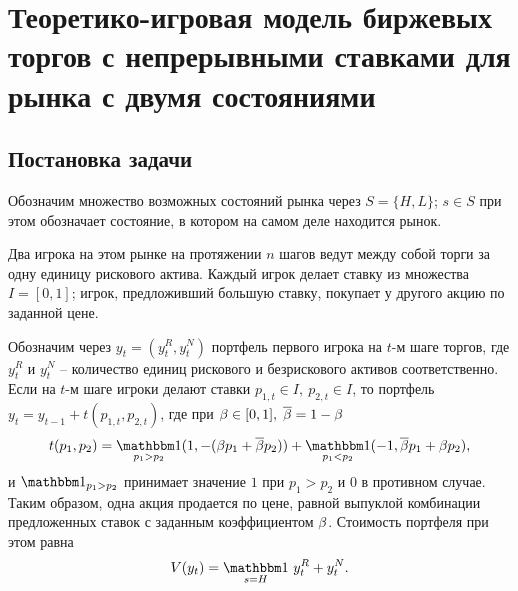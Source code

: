 \chapter{Теоретико-игровая модель биржевых торгов с непрерывными ставками для
  рынка с двумя состояниями} \label{chapt2}%
{
\newcommand{\Port}[1]{y_{#1}}
\newcommand*\dualFPS{\ensuremath{(P, \; \sigma)}}
\dualg[4][1=n, 2={\dualFPS}, 3=x, 4=\tau]{\ensuremath{g^*_{#1}(#3, #2, #4)}}
\newcommand*\dom{\ensuremath{\mathrm{dom\;}} }
\newcommand*\range{\ensuremath{\mathrm{range\;}}}


\section{Постановка задачи}
Обозначим множество возможных состояний рынка через $S = \{H, L\}$; $s \in S$ при этом обозначает состояние, в котором на самом деле находится рынок.

Два игрока на этом рынке на протяжении $n$ шагов ведут между собой торги за одну единицу рискового актива.
Каждый игрок делает ставку из множества $I = [0, 1]$; игрок, предложивший большую ставку, покупает у другого акцию по заданной цене.

Обозначим через $\Port{t} = (\Port{t}^R, \Port{t}^N)$ портфель первого игрока на $t$-м шаге торгов, где $\Port{t}^R$ и $\Port{t}^N$ -- количество единиц рискового и безрискового активов соответственно.
Если на $t$-м шаге игроки делают ставки $p_{1,t} \in I, \: p_{2,t} \in I$, то портфель $\Port{t} = \Port{t-1} + t(p_{1,t}, p_{2,t})$, где при $\beta \in [0, 1], \; {\overline{\beta}} = 1 - \beta$
\begin{equation}\label{eq:trans-mechanism}
  t(p_1, p_2) = \Ind_{p_1 > p_2} (1, -(\Co p_1 + \DCo p_2)) +
  \Ind_{p_1 < p_2} (-1, \DCo p_1 + \Co p_2),
\end{equation}
и $\Ind_{p_1 > p_2}$ принимает значение $1$ при $p_1 > p_2$ и $0$ в противном случае.
Таким образом, одна акция продается по цене, равной выпуклой комбинации предложенных ставок с заданным коэффициентом $\beta$.
Стоимость портфеля при этом равна
\begin{equation*}
  V(\Port{t})=\Ind_{s = H} \, \Port{t}^R + \Port{t}^N.
\end{equation*}

}
